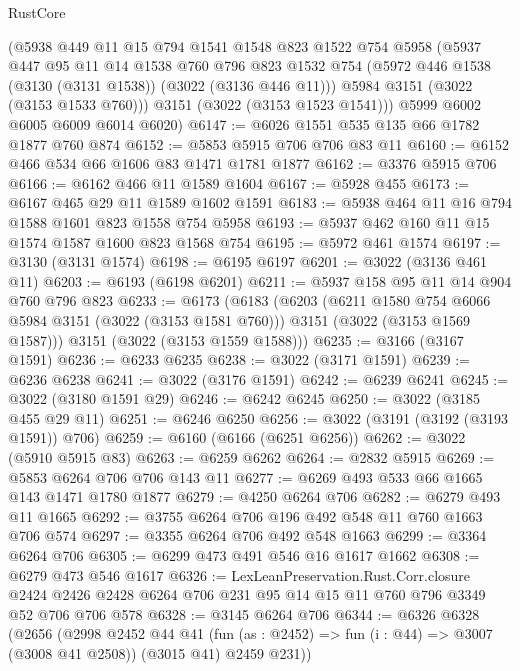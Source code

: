 \begin{lexlean}{RustCore}
\begin{coremodule}
      (@5938
        @449
        @11
        @15
        @794
        @1541
        @1548
        @823
        @1522
        @754
        @5958
        (@5937
          @447
          @95
          @11
          @14
          @1538
          @760
          @796
          @823
          @1532
          @754
          (@5972 @446 @1538 (@3130 (@3131 @1538)) (@3022 (@3136 @446 @11)))
          @5984
          @3151
          (@3022 (@3153 @1533 @760)))
        @3151
        (@3022 (@3153 @1523 @1541)))
      @5999
      @6002
      @6005
      @6009
      @6014
      @6020)
@6147 := @6026 @1551 @535 @135 @66 @1782 @1877 @760 @874
@6152 := @5853 @5915 @706 @706 @83 @11
@6160 := @6152 @466 @534 @66 @1606 @83 @1471 @1781 @1877
@6162 := @3376 @5915 @706
@6166 := @6162 @466 @11 @1589 @1604
@6167 := @5928 @455
@6173 := @6167 @465 @29 @11 @1589 @1602 @1591
@6183 := @5938 @464 @11 @16 @794 @1588 @1601 @823 @1558 @754 @5958
@6193 := @5937 @462 @160 @11 @15 @1574 @1587 @1600 @823 @1568 @754
@6195 := @5972 @461 @1574
@6197 := @3130 (@3131 @1574)
@6198 := @6195 @6197
@6201 := @3022 (@3136 @461 @11)
@6203 := @6193 (@6198 @6201)
@6211 := @5937 @158 @95 @11 @14 @904 @760 @796 @823
@6233 := @6173
    (@6183
      (@6203
        (@6211 @1580 @754 @6066 @5984 @3151 (@3022 (@3153 @1581 @760)))
        @3151
        (@3022 (@3153 @1569 @1587)))
      @3151
      (@3022 (@3153 @1559 @1588)))
@6235 := @3166 (@3167 @1591)
@6236 := @6233 @6235
@6238 := @3022 (@3171 @1591)
@6239 := @6236 @6238
@6241 := @3022 (@3176 @1591)
@6242 := @6239 @6241
@6245 := @3022 (@3180 @1591 @29)
@6246 := @6242 @6245
@6250 := @3022 (@3185 @455 @29 @11)
@6251 := @6246 @6250
@6256 := @3022 (@3191 (@3192 (@3193 @1591)) @706)
@6259 := @6160 (@6166 (@6251 @6256))
@6262 := @3022 (@5910 @5915 @83)
@6263 := @6259 @6262
@6264 := @2832 @5915
@6269 := @5853 @6264 @706 @706 @143 @11
@6277 := @6269 @493 @533 @66 @1665 @143 @1471 @1780 @1877
@6279 := @4250 @6264 @706
@6282 := @6279 @493 @11 @1665
@6292 := @3755 @6264 @706 @196 @492 @548 @11 @760 @1663 @706 @574
@6297 := @3355 @6264 @706 @492 @548 @1663
@6299 := @3364 @6264 @706
@6305 := @6299 @473 @491 @546 @16 @1617 @1662
@6308 := @6279 @473 @546 @1617
@6326 := LexLeanPreservation.Rust.Corr.closure
    @2424
    @2426
    @2428
    @6264
    @706
    @231
    @95
    @14
    @15
    @11
    @760
    @796
    @3349
    @52
    @706
    @706
    @578
@6328 := @3145 @6264 @706
@6344 := @6326
    @6328
    (@2656
      (@2998
        @2452
        @44
        @41
        (fun (as : @2452) => fun (i : @44) => @3007 (@3008 @41 @2508))
        (@3015 @41)
        @2459
        @231))

\end{coremodule}
\end{lexlean}
